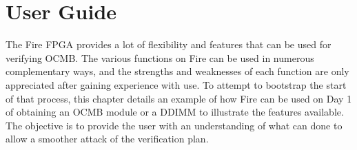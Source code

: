 \section{User Guide} \label{section_userguide}

The Fire FPGA provides a lot of flexibility and features that can be
used for verifying OCMB. The various functions on Fire can be used in
numerous complementary ways, and the strengths and weaknesses of each
function are only appreciated after gaining experience with use. To
attempt to bootstrap the start of that process, this chapter details
an example of how Fire can be used on Day 1 of obtaining an OCMB
module or a DDIMM to illustrate the features available. The objective
is to provide the user with an understanding of what can done to allow
a smoother attack of the verification plan.

